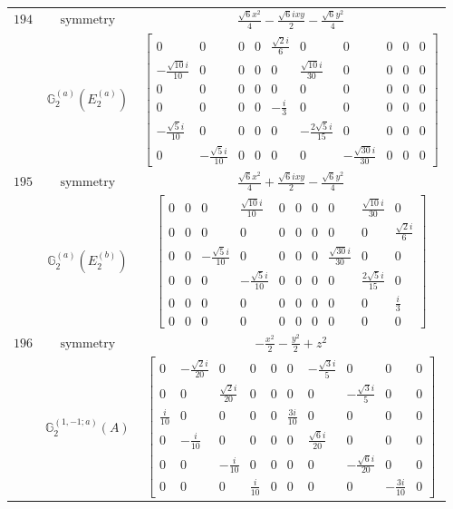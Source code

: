 \documentclass[fleqn,8pt,landscape]{jsarticle}
\begin{document}
\begin{longtable}{ccc}
$ 194 $ & $ \text{symmetry} $ & $ \frac{\sqrt{6} x^{2}}{4} - \frac{\sqrt{6} i x y}{2} - \frac{\sqrt{6} y^{2}}{4} $ \\
$  $ & $ \mathbb{G}_{2}^{(a)}(E_{2}^{(a)}) $ & $ \begin{bmatrix} 0 & 0 & 0 & 0 & \frac{\sqrt{2} i}{6} & 0 & 0 & 0 & 0 & 0 \\ - \frac{\sqrt{10} i}{10} & 0 & 0 & 0 & 0 & \frac{\sqrt{10} i}{30} & 0 & 0 & 0 & 0 \\ 0 & 0 & 0 & 0 & 0 & 0 & 0 & 0 & 0 & 0 \\ 0 & 0 & 0 & 0 & - \frac{i}{3} & 0 & 0 & 0 & 0 & 0 \\ - \frac{\sqrt{5} i}{10} & 0 & 0 & 0 & 0 & - \frac{2 \sqrt{5} i}{15} & 0 & 0 & 0 & 0 \\ 0 & - \frac{\sqrt{5} i}{10} & 0 & 0 & 0 & 0 & - \frac{\sqrt{30} i}{30} & 0 & 0 & 0 \end{bmatrix} $ \\ \hline
$ 195 $ & $ \text{symmetry} $ & $ \frac{\sqrt{6} x^{2}}{4} + \frac{\sqrt{6} i x y}{2} - \frac{\sqrt{6} y^{2}}{4} $ \\
$  $ & $ \mathbb{G}_{2}^{(a)}(E_{2}^{(b)}) $ & $ \begin{bmatrix} 0 & 0 & 0 & \frac{\sqrt{10} i}{10} & 0 & 0 & 0 & 0 & \frac{\sqrt{10} i}{30} & 0 \\ 0 & 0 & 0 & 0 & 0 & 0 & 0 & 0 & 0 & \frac{\sqrt{2} i}{6} \\ 0 & 0 & - \frac{\sqrt{5} i}{10} & 0 & 0 & 0 & 0 & \frac{\sqrt{30} i}{30} & 0 & 0 \\ 0 & 0 & 0 & - \frac{\sqrt{5} i}{10} & 0 & 0 & 0 & 0 & \frac{2 \sqrt{5} i}{15} & 0 \\ 0 & 0 & 0 & 0 & 0 & 0 & 0 & 0 & 0 & \frac{i}{3} \\ 0 & 0 & 0 & 0 & 0 & 0 & 0 & 0 & 0 & 0 \end{bmatrix} $ \\ \hline
$ 196 $ & $ \text{symmetry} $ & $ - \frac{x^{2}}{2} - \frac{y^{2}}{2} + z^{2} $ \\
$  $ & $ \mathbb{G}_{2}^{(1,-1;a)}(A) $ & $ \begin{bmatrix} 0 & - \frac{\sqrt{2} i}{20} & 0 & 0 & 0 & 0 & - \frac{\sqrt{3} i}{5} & 0 & 0 & 0 \\ 0 & 0 & \frac{\sqrt{2} i}{20} & 0 & 0 & 0 & 0 & - \frac{\sqrt{3} i}{5} & 0 & 0 \\ \frac{i}{10} & 0 & 0 & 0 & 0 & \frac{3 i}{10} & 0 & 0 & 0 & 0 \\ 0 & - \frac{i}{10} & 0 & 0 & 0 & 0 & \frac{\sqrt{6} i}{20} & 0 & 0 & 0 \\ 0 & 0 & - \frac{i}{10} & 0 & 0 & 0 & 0 & - \frac{\sqrt{6} i}{20} & 0 & 0 \\ 0 & 0 & 0 & \frac{i}{10} & 0 & 0 & 0 & 0 & - \frac{3 i}{10} & 0 \end{bmatrix} $ \\ \hline

\end{longtable}
\end{document}
